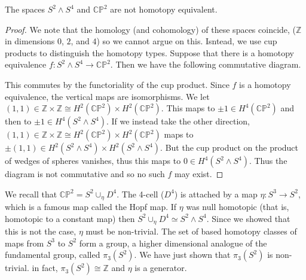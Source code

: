 \begin{proposition}
    The spaces $S^2 \wedge S^4$ and $\mathbb C \mathbb P^2$ are not homotopy equivalent.
\end{proposition}

\begin{proof}
    We note that the homology (and cohomology) of these spaces coincide, ($\mathbb Z$ in dimensions $0$, $2$, and $4$) so we cannot argue on this. Isntead, we use cup products to distinguish the homotopy types. Suppose that there is a homotopy equivalence $f: S^2 \wedge S^4 \to \mathbb C \mathbb P^2$. Then we have the following commutative diagram.
    \begin{center}
    \end{center}
    This commutes by the functoriality of the cup product. Since $f$ is a homotopy equivalence, the vertical maps are isomorphisms. We let $(1, 1) \in \mathbb Z \times \mathbb Z \cong H^2(\mathbb C \mathbb P^2) \times H^2(\mathbb C \mathbb P^2)$. This maps to $\pm 1 \in H^4(\mathbb C \mathbb P^2)$ and then to $\pm 1 \in H^4(S^2 \wedge S^4)$. If we instead take the other direction, $(1, 1) \in \mathbb Z \times \mathbb Z \cong H^2(\mathbb C \mathbb P^2) \times H^2(\mathbb C \mathbb P^2)$ maps to $\pm (1, 1) \in H^2(S^2 \wedge S^4) \times H^2(S^2 \wedge S^4)$. But the cup product on the product of wedges of spheres vanishes, thus this maps to $0 \in H^4(S^2 \wedge S^4)$. Thus the diagram is not commutative and so no such $f$ may exist. 
\end{proof}

We recall that $\mathbb C \mathbb P^2 = S^2 \cup_{\eta} D^4$. The 4-cell ($D^4$) is attached by a map $\eta: S^3 \to S^2$, which is a famous map called the Hopf map. If $\eta$ was null homotopic (that is, homotopic to a constant map) then $S^2 \cup_{\eta} D^4 \simeq S^2 \wedge S^4$. Since we showed that this is not the case, $\eta$ must be non-trivial. The set of based homotopy classes of maps from $S^3$ to $S^2$ form a group, a higher dimensional analogue of the fundamental group, called $\pi_3(S^2)$. We have just shown that $\pi_3(S^2)$ is non-trivial. in fact, $\pi_3(S^2) \cong \mathbb Z$ and $\eta$ is a generator.

